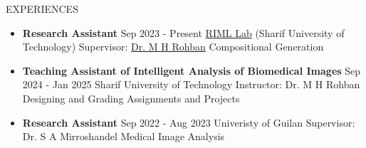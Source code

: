 \documentclass[]{CV}
\begin{document}


\begin{section}{EXPERIENCES}
\begin{multicols}{2}
\begin{itemize}

\item {\textbf{Research Assistant} \newline Sep 2023 - Present \newline \href{https://www.linkedin.com/company/robust-and-interpretable-machine-learning-lab}{RIML Lab} (Sharif University of Technology) \newline Supervisor:  \href{https://www.linkedin.com/in/mohammad-hossein-rohban-75567677}{Dr. M H Rohban} \newline Compositional Generation}

\item {\textbf{Teaching Assistant of Intelligent Analysis of Biomedical Images} \newline Sep 2024 - Jan 2025 \newline Sharif University of Technology \newline Instructor: Dr. M H Rohban \newline Designing and Grading Assignments and Projects}

\columnbreak

\item {\textbf{Research Assistant} \newline Sep 2022 - Aug 2023 \newline Univeristy of Guilan \newline Supervisor: Dr. S A Mirroshandel \newline Medical Image Analysis}



\end{itemize}
\end{multicols}
\end{section}
\end{document}
